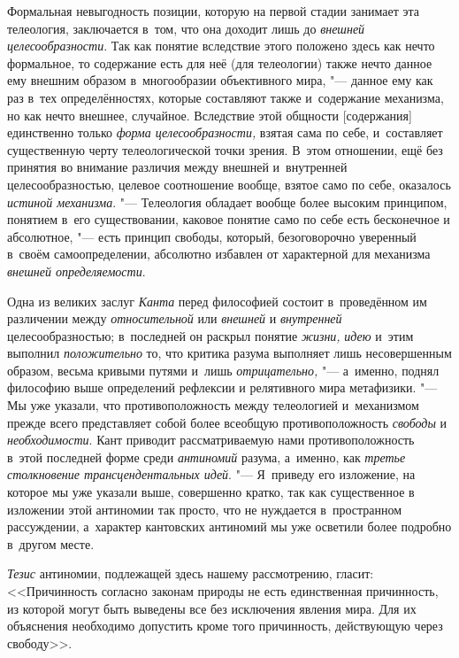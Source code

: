 Формальная невыгодность позиции, которую на первой стадии
занимает эта телеология, заключается в~том, что она доходит лишь до
{\em внешней целесообразности}.
Так как понятие вследствие этого положено здесь как нечто
формальное, то содержание есть для неё (для телеологии) также нечто данное
ему внешним образом в~многообразии объективного мира, "---
данное ему как раз в~тех определённостях, которые составляют
также и~содержание механизма, но как нечто внешнее, случайное. Вследствие
этой общности [содержания] единственно только
{\em форма целесообразности,}
взятая сама по себе, и~составляет существенную черту
телеологической точки зрения. В~этом отношении, ещё без принятия во
внимание различия между внешней и~внутренней целесообразностью, целевое
соотношение вообще, взятое само по себе, оказалось
{\em истиной механизма}. "---
Телеология обладает вообще более высоким принципом, понятием
в~его существовании, каковое понятие само по себе есть бесконечное и
абсолютное, "--- есть принцип свободы, который, безоговорочно
уверенный в~своём самоопределении, абсолютно избавлен от характерной для
механизма {\em внешней определяемости}.

Одна из великих заслуг
{\em Канта} перед
философией состоит в~проведённом им различении между
{\em относительной} или
{\em внешней} и
{\em внутренней}
целесообразностью; в~последней он раскрыл понятие
{\em жизни,}
{\em идею} и~этим выполнил
{\em положительно} то,
что критика разума выполняет лишь несовершенным образом, весьма кривыми
путями и~лишь {\em отрицательно,} "---
а~именно, поднял философию выше определений рефлексии и
релятивного мира метафизики. "--- Мы уже указали, что
противоположность между телеологией и~механизмом прежде всего представляет
собой более всеобщую противоположность
{\em свободы} и
{\em необходимости}. Кант
приводит рассматриваемую нами противоположность в~этой последней форме
среди {\em антиномий}
разума, а~именно, как
{\em третье столкновение
трансцендентальных идей}. "--- Я~приведу его изложение, на
которое мы уже указали выше, совершенно кратко, так как существенное в
изложении этой антиномии так просто, что не нуждается в~пространном
рассуждении, а~характер кантовских антиномий мы уже осветили
более подробно в~другом месте.

{\em Тезис} антиномии,
подлежащей здесь нашему рассмотрению, гласит: <<Причинность согласно законам
природы не есть единственная причинность, из которой могут быть выведены
все без исключения явления мира. Для их объяснения необходимо допустить
кроме того причинность, действующую через свободу>>.

